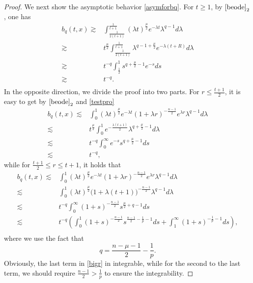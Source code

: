 \documentclass[10pt,a4paper]{amsart}
\begin{document}
\begin{proof}
We next show the asymptotic behavior \eqref{asymforbq}. For $t\ge 1$, by $\eqref{beode}_2$, one has
\begin{equation}\label{l43}
\begin{aligned}
b_q(t, x)\gtrsim& \int_{\frac{1}{2(t+1)}}^{\frac{1}{t+1}}(\lambda t)^{\frac{\mu}{2}}
e^{-\lambda t}\lambda^{q-1}d\lambda\\
\gtrsim& t^{\frac{\mu}2}\int_{\frac{1}{2(t+1)}}^{\frac{1}{t+1}}\lambda^{q-1+\frac{\mu}{2}}
e^{-\lambda (t+R)}d\lambda\\
\gtrsim& t^{-q}\int_{\frac12}^1s^{q+\frac {\mu}{2}-1}e^{-s}ds\\
\gtrsim& t^{-q}.\\
\end{aligned}
\end{equation}
In the opposite direction, we divide the proof into two parts. For $r\le \frac{t+1}{2}$, it is easy to get by $\eqref{beode}_2$ and \eqref{testpro}
\begin{equation}\label{l44}
\begin{aligned}
b_q(t, x)\lesssim& \int_0^1(\lambda t)^{\frac{\mu}2}e^{-\lambda t}(1+\lambda r)^{-\frac{n-1}2}e^{\lambda r}\lambda^{q-1}d\lambda\\
\lesssim&t^{\frac{\mu}2}\int_0^1e^{-\frac{\lambda(t+1)}{2}}
\lambda^{q+\frac{\mu}2-1}d\lambda\\
\lesssim&t^{-q}\int_0^{\infty}e^{-s}s^{q+\frac{\mu}{2}-1}ds\\
\lesssim&t^{-q},
\end{aligned}
\end{equation}
while for $\frac{t+1}{2}\le r\le t+1$, it holds that
\begin{equation}\label{bigr}
\begin{aligned}
b_q(t, x)\lesssim& \int_0^1(\lambda t)^{\frac{\mu}2}e^{-\lambda t}(1+\lambda r)^{-\frac{n-1}2}e^{\lambda r}\lambda^{q-1}d\lambda\\
\lesssim&\int_0^1(\lambda t)^{\frac \mu 2}\bigg(1+\lambda(t+1)\bigg)^{-\frac{n-1}{2}}\lambda^{q-1} d\lambda\\
\lesssim&t^{-q}\int_0^{\infty}(1+s)^{-\frac{n-1}{2}}s^{\frac \mu 2+q-1}ds\\
\lesssim&t^{-q}\left(\int_0^{1}(1+s)^{-\frac{n-1}{2}}s^{\frac{n-1}2-\frac 1p-1}ds+\int_1^{\infty}(1+s)^{-\frac 1p-1}ds\right),\\
\end{aligned}
\end{equation}
where we use the fact that
\[
q=\frac{n-\mu-1}{2}-\frac{1}{p}.
\]
Obviously, the last term in \eqref{bigr} in integrable, while for the second to the last term, we should require $\frac{n-1}{2}>\frac 1p$ to ensure the integrability.

\end{proof}
\end{document}
